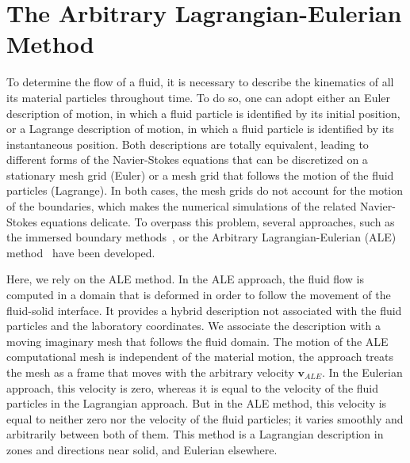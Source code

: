 \chapter{The Arbitrary Lagrangian-Eulerian Method}
To determine the flow of a fluid, it is necessary to describe the kinematics of all its material particles throughout time. To do so, one can adopt either an Euler description of motion, in which a fluid particle is identified by its initial position, or a Lagrange description of motion, in which a fluid particle is identified by its instantaneous position. 
Both descriptions are totally equivalent, leading to different forms of the Navier-Stokes equations that can be discretized on a stationary mesh grid (Euler) or a mesh grid that follows the motion of the fluid particles (Lagrange). In both cases, the mesh grids do not account for the motion of the boundaries, which makes the numerical simulations of the related Navier-Stokes equations delicate. To overpass this problem, several approaches, such as the immersed boundary methods~\cite{puscas2015three, puscas2015time, puscas2015conservative}, or the Arbitrary Lagrangian-Eulerian (ALE) method~\cite{donea2004arbitrary, fourestey2004second, koobus2000computation} have been developed.

Here, we rely on the ALE method. In the ALE approach, the fluid flow is computed in a domain that is deformed in order to follow the movement of the fluid-solid interface. It provides a hybrid description not associated with the fluid particles and the laboratory coordinates. We associate the description with a moving imaginary mesh that follows the fluid domain.  The motion of the ALE computational mesh is independent of the material motion, the approach treats the mesh as a frame that moves with the arbitrary velocity $\mathbf{v}_{ALE}$. In the Eulerian approach, this velocity is zero, whereas it is equal to the velocity of the fluid particles in the Lagrangian approach. But in the ALE method, this velocity is equal to neither zero nor the velocity of the fluid particles; it varies smoothly and arbitrarily between both of them.  This method is a Lagrangian description in zones and directions near solid, and Eulerian elsewhere. 

